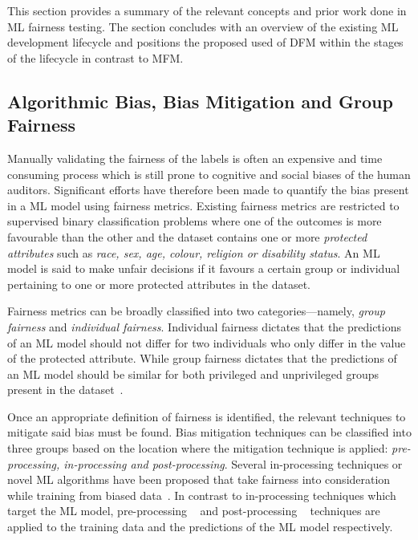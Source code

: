 \documentclass[sigconf,review,anonymous]{acmart}
\begin{document}
This section provides a summary of the relevant concepts and prior
work done in ML fairness testing. The section concludes with an
overview of the existing ML development lifecycle and positions the
proposed used of DFM within the stages of the lifecycle in contrast to
MFM.

\subsection{Algorithmic Bias, Bias Mitigation and Group Fairness}\label{sec:bias-fairness}

Manually validating the fairness of the labels is often an expensive
and time consuming process which is still prone to cognitive and
social biases of the human auditors. Significant efforts have
therefore been made to quantify the bias present in a ML model using
fairness metrics. Existing fairness metrics are restricted to
supervised binary classification problems where one of the outcomes is
more favourable than the other and the dataset contains one or more
\emph{protected attributes} such as \emph{race, sex, age, colour,
religion or disability status}. An ML model is said to make unfair
decisions if it favours a certain group or individual pertaining to
one or more protected attributes in the dataset.

Fairness metrics can be broadly classified into two
categories---namely, \emph{group fairness} and \emph{individual
fairness}. Individual fairness dictates that the predictions of an ML
model should not differ for two individuals who only differ in the
value of the protected attribute. While group fairness dictates that
the predictions of an ML model should be similar for both privileged
and unprivileged groups present in the
dataset \cite{castelnovo2022clarification,hellman2020measuring,mitchell2021algorithmic,kusner2017counterfactual,grgic2016case,dwork2012fairness,barocas2019fairness,barocas2016big,hardt2016equality,binns2018fairness,verma2018fairness,saxena2019fairness}.

Once an appropriate definition of fairness is identified, the relevant
techniques to mitigate said bias must be found. Bias mitigation
techniques can be classified into three groups based on the location
where the mitigation technique is applied: \emph{pre-processing,
in-processing and post-processing}. Several in-processing techniques
or novel ML algorithms have been proposed that take fairness into
consideration while training from biased
data \cite{zhang2018mitigating,agarwal2018reductions,kearns2018preventing,kamishima2012fairness}.
In contrast to in-processing techniques which target the ML model,
pre-processing
 \cite{feldman2015certifying,zemel2013learning,calmon2017optimized,kamiran2012data}
and post-processing
 \cite{pleiss2017fairness,hardt2016equality,kamiran2012decision}
techniques are applied to the training data and the predictions of the
ML model respectively.
\end{document}
